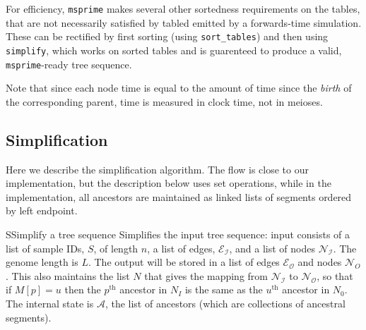 \documentclass{article}
\newcommand{\msprime}{\texttt{msprime}}
\begin{document}
For efficiency, \msprime{} makes several other sortedness requirements on the tables,
that are not necessarily satisfied by tabled emitted by a forwards-time simulation.
These can be rectified by first sorting (using \texttt{sort\_tables})
and then using \texttt{simplify}, which works on sorted tables
and is guarenteed to produce a valid, \msprime{}-ready tree sequence.

Note that since each node time is equal to the amount of time since the \emph{birth} of the
corresponding parent, time is measured in clock time, not in meioses.


\subsection*{Simplification}

Here we describe the simplification algorithm.
The flow is close to our implementation,
but the description below uses set operations,
while in the implementation,
all ancestors are maintained as linked lists of segments
ordered by left endpoint.

\begin{taocpalg}{S}{Simplify a tree sequence}
{Simplifies the input tree sequence:
    input consists of 
    a list of sample IDs, $S$, of length $n$,
    a list of edges, $\mathcal{E_I}$,
    and a list of nodes $\mathcal{N_I}$.
    The genome length is $L$.
    The output will be stored in a list of edges $\mathcal{E_O}$ 
    and nodes $\mathcal{N}_O$.
    This also maintains the list $N$ that gives the mapping 
    from $\mathcal{N_I}$ to $\mathcal{N_O}$,
    so that if $M[p] = u$ then the $p^\text{th}$ ancestor in $N_I$
    is the same as the $u^\text{th}$ ancestor in $N_0$.
    The internal state is $\mathcal{A}$, the list of ancestors
    (which are collections of ancestral segments).
}





\end{taocpalg}
\end{document}
